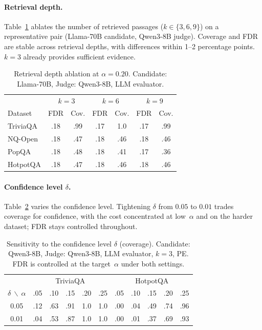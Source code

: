 \paragraph{Retrieval depth.}
Table~\ref{tab:retrieval_depth} ablates the number of retrieved passages ($k \in \{3, 6, 9\}$) on a representative pair (Llama-70B candidate, Qwen3-8B judge). Coverage and FDR are stable across retrieval depths, with differences within 1--2 percentage points. $k\!=\!3$ already provides sufficient evidence.

\begin{table}[h]
\centering
\small
\caption{Retrieval depth ablation at $\alpha\!=\!0.20$. Candidate: Llama-70B, Judge: Qwen3-8B, LLM evaluator.}
\label{tab:retrieval_depth}
\setlength{\tabcolsep}{11.5pt}
\begin{tabular}{l|cc|cc|cc}
\toprule
 & \multicolumn{2}{c|}{$k=3$} & \multicolumn{2}{c|}{$k=6$} & \multicolumn{2}{c}{$k=9$} \\
Dataset & FDR & Cov. & FDR & Cov. & FDR & Cov. \\
\midrule
TriviaQA & .18 & .99 & .17 & 1.0 & .17 & .99 \\
NQ-Open  & .18 & .47 & .18 & .46 & .18 & .46 \\
PopQA    & .18 & .48 & .18 & .41 & .17 & .36 \\
HotpotQA & .18 & .47 & .18 & .46 & .18 & .46 \\
\bottomrule
\end{tabular}
\end{table}

\paragraph{Confidence level $\delta$.} Table~\ref{tab:delta} varies the confidence level. Tightening $\delta$ from $0.05$ to $0.01$ trades coverage for confidence, with the cost concentrated at low~$\alpha$ and on the harder dataset; FDR stays controlled throughout.

\begin{table}[h]
\centering
\small
\caption{Sensitivity to the confidence level $\delta$ (coverage). Candidate: Qwen3-8B, Judge: Qwen3-8B, LLM evaluator, $k\!=\!3$, PE. FDR is controlled at the target~$\alpha$ under both settings.}
\label{tab:delta}
\begin{tabular*}{\textwidth}{@{\extracolsep{\fill}}c|ccccc|ccccc@{}}
\toprule
 & \multicolumn{5}{c|}{TriviaQA} & \multicolumn{5}{c}{HotpotQA} \\
$\delta~\backslash~\alpha$ & .05 & .10 & .15 & .20 & .25 & .05 & .10 & .15 & .20 & .25 \\
\midrule
0.05 & .12 & .63 & .91 & 1.0 & 1.0 & .00 & .04 & .49 & .74 & .96 \\
0.01 & .04 & .53 & .87 & 1.0 & 1.0 & .00 & .01 & .37 & .69 & .93 \\
\bottomrule
\end{tabular*}
\end{table}

